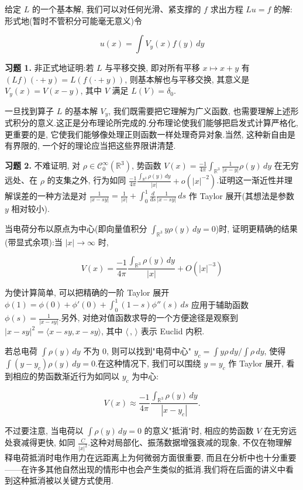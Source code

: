 给定 $L$ 的一个基本解, 我们可以对任何光滑、紧支撑的 $f$ 求出方程 $Lu = f$ 的解:形式地(暂时不管积分可能毫无意义)令

\[
u(x) = \int V_y(x)f(y)\, dy
\]

\textbf{习题 1.} 非正式地证明:若 $L$ 与平移交换, 即对所有平移 $x\mapsto x+y$ 有 $(Lf)(\cdot+y) = L(f(\cdot+y))$, 则基本解也与平移交换, 其意义是 $V_y(x) = V(x-y)$, 其中 $V$ 满足 $L(V) = \delta_0$.

一旦找到算子 $L$ 的基本解 $V_y$, 我们既需要把它理解为广义函数, 也需要理解上述形式积分的意义.这正是分布理论所完成的.分布理论使我们能够把启发式计算严格化, 更重要的是, 它使我们能够像处理正则函数一样处理奇异对象.当然, 这种新自由是有界限的, 一个好的理论应当把这些界限讲清楚.

\textbf{习题 2.} 不难证明, 对 $\rho\in\mathcal{C}_0^{\infty}(\mathbb{R}^3)$, 势函数 $V(x) = \frac{-1}{4\pi}\int_{\mathbb{R}^3}\frac{1}{|x-y|}\rho(y)\, dy$ 在无穷远处、在 $\rho$ 的支集之外, 行为如同 $\frac{-1}{4\pi}\frac{\int_{\mathbb{R}^3}\rho(y)\, dy}{|x|} + o(|x|^{-2})$.证明这一渐近性并理解误差的一种方法是对 $\frac{1}{|x-sy|} = \frac{1}{|x|} + \int_0^1\frac{d}{ds}\frac{1}{|x-sy|}\, ds$ 作 Taylor 展开(其想法是参数 $y$ 相对较小).

当电荷分布以原点为中心(即向量值积分 $\int_{\mathbb{R}^3}y\rho(y)\, dy = 0$)时, 证明更精确的结果(带显式余项):当 $|x|\to\infty$ 时,

\[
V(x) = \frac{-1}{4\pi}\frac{\int_{\mathbb{R}^3}\rho(y)\, dy}{|x|} + O(|x|^{-3})
\]

为使计算简单, 可以把精确的一阶 Taylor 展开 $\phi(1) = \phi(0) + \phi'(0) + \int_0^1(1-s)\phi''(s)\, ds$ 应用于辅助函数 $\phi(s) = \frac{1}{|x-sy|}$.另外, 对绝对值函数求导的一个方便途径是观察到 $|x-sy|^2 = \langle x-sy, x-sy\rangle$, 其中 $\langle\, ,\, \rangle$ 表示 Euclid 内积.

\begin{remark*}
若总电荷 $\int\rho(y)\, dy$ 不为 0, 则可以找到"电荷中心" $y_c = \int y\rho\, dy/\int\rho\, dy$, 使得 $\int(y-y_c)\rho(y)\, dy = 0$.在这种情况下, 我们可以围绕 $y = y_c$ 作 Taylor 展开, 看到相应的势函数渐近行为如同以 $y_c$ 为中心:

\[
V(x) \approx \frac{-1}{4\pi}\frac{\int_{\mathbb{R}^3}\rho(y)\, dy}{|x-y_c|}.
\]

不过要注意, 当电荷以 $\int\rho(y)\, dy = 0$ 的意义"抵消"时, 相应的势函数 $V$ 在无穷远处衰减得更快, 如同 $\frac{C}{|x|^2}$.这种对局部化、振荡数据增强衰减的现象, 不仅在物理解释电荷抵消时电作用力在远距离上为何微弱方面很重要, 而且在分析中也十分重要——在许多其他自然出现的情形中也会产生类似的抵消.我们将在后面的讲义中看到这种抵消被以关键方式使用.
\end{remark*}

